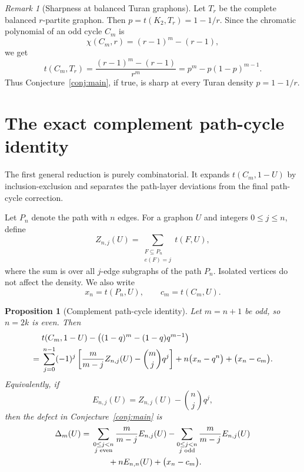 \documentclass[11pt]{article}
\newtheorem{proposition}[theorem]{Proposition}
\theoremstyle{definition}
\theoremstyle{remark}
\newtheorem{remark}[theorem]{Remark}
\newcommand{\0}{\mathbf 0}
\begin{document}
\begin{remark}[Sharpness at balanced Turan graphons]
Let $T_r$ be the complete balanced $r$-partite graphon.  Then $p=t(K_2,T_r)=1-1/r$.  Since the chromatic polynomial of an odd cycle $C_m$ is
\[
        \chi(C_m,r)=(r-1)^m-(r-1),
\]
we get
\[
        t(C_m,T_r)=\frac{(r-1)^m-(r-1)}{r^m}
        =p^m-p(1-p)^{m-1}.
\]
Thus Conjecture~\ref{conj:main}, if true, is sharp at every Turan density $p=1-1/r$.
\end{remark}

\section{The exact complement path-cycle identity}

The first general reduction is purely combinatorial.  It expands $t(C_m,1-U)$ by inclusion-exclusion and separates the path-layer deviations from the final path-cycle correction.

Let $P_n$ denote the path with $n$ edges.  For a graphon $U$ and integers $0\le j\le n$, define
\[
        Z_{n,j}(U)
        =
        \sum_{\substack{F\subseteq P_n\\ e(F)=j}} t(F,U),
\]
where the sum is over all $j$-edge subgraphs of the path $P_n$.  Isolated vertices do not affect the density.  We also write
\[
        x_n=t(P_n,U),
        \qquad
        c_m=t(C_m,U).
\]

\begin{proposition}[Complement path-cycle identity]\label{prop:path-cycle-identity}
Let $m=n+1$ be odd, so $n=2k$ is even.  Then
\begin{align}
& t(C_m,1-U)-\bigl((1-q)^m-(1-q)q^{m-1}\bigr) \notag\\
={}&
\sum_{j=0}^{n-1}(-1)^j
\left[
        \frac{m}{m-j}Z_{n,j}(U)-\binom mj q^j
\right]
+n\bigl(x_n-q^n\bigr)
+\bigl(x_n-c_m\bigr).\label{eq:path-cycle-main}
\end{align}
Equivalently, if
\[
        E_{n,j}(U)=Z_{n,j}(U)-\binom nj q^j,
\]
then the defect in Conjecture~\ref{conj:main} is
\begin{align}
\Delta_m(U)
={}&
\sum_{\substack{0\le j<n\\ j\text{ even}}}
        \frac{m}{m-j}E_{n,j}(U)
-
\sum_{\substack{0\le j<n\\ j\text{ odd}}}
        \frac{m}{m-j}E_{n,j}(U)     \notag\\
&\qquad
+nE_{n,n}(U)
+\bigl(x_n-c_m\bigr).\label{eq:master-defect}
\end{align}
\end{proposition}
\end{document}
